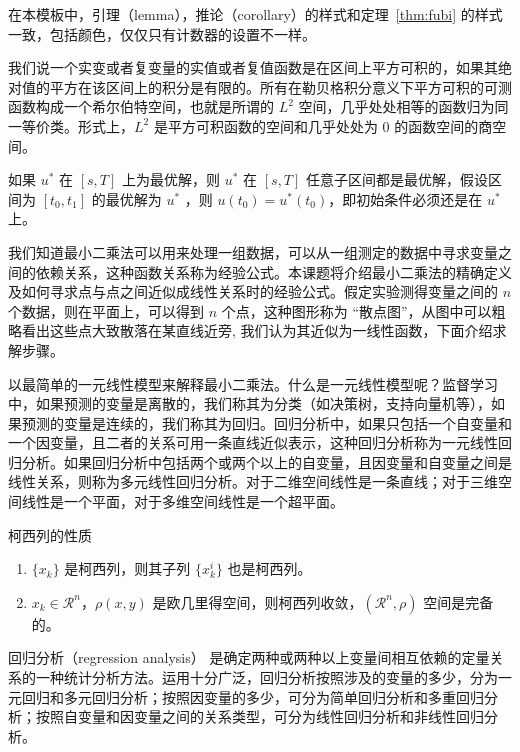 \documentclass[math,code,logic,quote,code,mode=simple]{codedumpnote}
\begin{document}
\begin{note}
在本模板中，引理（lemma），推论（corollary）的样式和定理~\ref{thm:fubi} 的样式一致，包括颜色，仅仅只有计数器的设置不一样。
\end{note}


我们说一个实变或者复变量的实值或者复值函数是在区间上平方可积的，如果其绝对值的平方在该区间上的积分是有限的。所有在勒贝格积分意义下平方可积的可测函数构成一个希尔伯特空间，也就是所谓的 $L^2$ 空间，几乎处处相等的函数归为同一等价类。形式上，$L^2$ 是平方可积函数的空间和几乎处处为 0 的函数空间的商空间。

\begin{proposition}[最优性原理] \label{pro:max}
如果 $u^*$ 在 $[s,T]$ 上为最优解，则 $u^*$ 在 $[s, T]$ 任意子区间都是最优解，假设区间为 $[t_0, t_1]$ 的最优解为 $u^*$ ，则 $u(t_0)=u^{*}(t_0)$，即初始条件必须还是在 $u^*$ 上。
\end{proposition}

我们知道最小二乘法可以用来处理一组数据，可以从一组测定的数据中寻求变量之间的依赖关系，这种函数关系称为经验公式。本课题将介绍最小二乘法的精确定义及如何寻求点与点之间近似成线性关系时的经验公式。假定实验测得变量之间的 $n$ 个数据，则在平面上，可以得到 $n$ 个点，这种图形称为 “散点图”，从图中可以粗略看出这些点大致散落在某直线近旁, 我们认为其近似为一线性函数，下面介绍求解步骤。

以最简单的一元线性模型来解释最小二乘法。什么是一元线性模型呢？监督学习中，如果预测的变量是离散的，我们称其为分类（如决策树，支持向量机等），如果预测的变量是连续的，我们称其为回归。回归分析中，如果只包括一个自变量和一个因变量，且二者的关系可用一条直线近似表示，这种回归分析称为一元线性回归分析。如果回归分析中包括两个或两个以上的自变量，且因变量和自变量之间是线性关系，则称为多元线性回归分析。对于二维空间线性是一条直线；对于三维空间线性是一个平面，对于多维空间线性是一个超平面。

\begin{property}\label{property:cauchy}
柯西列的性质
\begin{enumerate}
\item $\{x_k\}$ 是柯西列，则其子列 $\{x_k^i\}$ 也是柯西列。
\item $x_k\in \mathcal{R}^n$，$\rho(x,y)$ 是欧几里得空间，则柯西列收敛，$(\mathcal{R}^n,\rho)$ 空间是完备的。
\end{enumerate}
\end{property}

\begin{conclusion}
回归分析（regression analysis） 是确定两种或两种以上变量间相互依赖的定量关系的一种统计分析方法。运用十分广泛，回归分析按照涉及的变量的多少，分为一元回归和多元回归分析；按照因变量的多少，可分为简单回归分析和多重回归分析；按照自变量和因变量之间的关系类型，可分为线性回归分析和非线性回归分析。
\end{conclusion}
\end{document}
